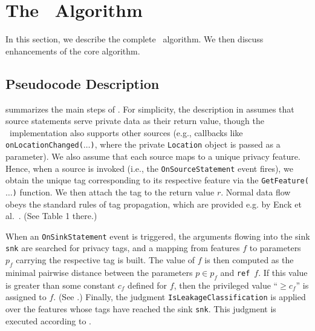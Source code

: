 \section{The \Tool\ Algorithm}\label{Se:bayesalg}

In this section, we describe the complete \Tool\ algorithm. We then discuss enhancements of the core algorithm.

\subsection{Pseudocode Description}

 summarizes the main steps of \Tool. For simplicity, the description in  assumes that source statements serve private data as their return value, though the \Tool\ implementation also supports other sources (e.g., callbacks like \texttt{onLocationChanged($\ldots$)}, where the private \texttt{Location} object is passed as a parameter). We also assume that each source maps to a unique privacy feature. Hence, when a source is invoked (i.e., the \texttt{OnSourceStatement} event fires), we obtain the unique tag corresponding to its respective feature via the 
\texttt{GetFeature($\ldots$)} function. We then attach the tag to the return value $r$. Normal data flow obeys the standard rules of tag propagation, which 
are provided e.g. by Enck et al.~\cite{EGCCJMS:OSDI10}. (See Table 1 there.)

When an \texttt{OnSinkStatement} event is triggered, the arguments flowing into the sink \texttt{snk} are searched for privacy tags, and a mapping from features $f$ to parameters $p_f$ carrying the respective tag is built. The value of $f$  is then computed as the minimal pairwise distance between the parameters $p \in p_f$
and {\tt ref}\ $f$. If this value is greater than some constant $c_f$ defined for $f$, then the privileged value ``$\geq c_f$'' is assigned to $f$. (See .) Finally, the judgment \texttt{IsLeakageClassification} is applied over the features whose tags have reached the sink \texttt{snk}. This judgment is executed according to .

